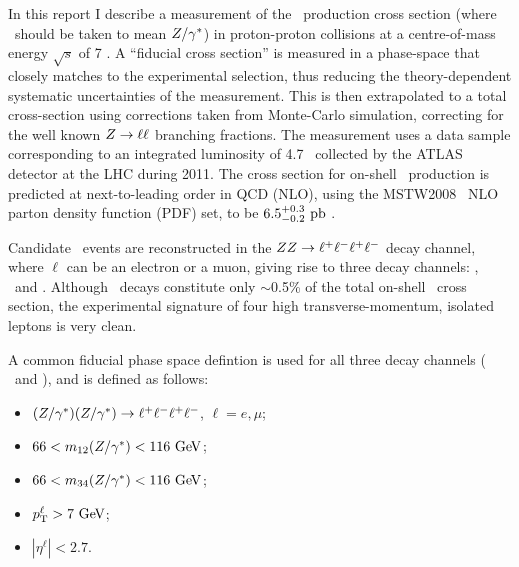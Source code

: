 In this report I describe a measurement of the \ZZ\ production cross section
(where \Z\ should be taken 
to mean $Z/\gamma^{*}$) in proton-proton collisions at a centre-of-mass energy $\sqrt{s}$ of 7 \TeV.
A ``fiducial cross section'' is measured in a phase-space that closely matches
to the experimental selection, 
thus reducing the theory-dependent systematic uncertainties of the measurement.
This is then extrapolated to a total cross-section using corrections taken from
Monte-Carlo simulation, correcting for the well known $Z \rightarrow \ell \ell$
branching fractions.
The measurement uses a data sample corresponding to an integrated luminosity of 4.7 \ifb\ collected by the ATLAS detector at 
the LHC during 2011. 
The cross section for on-shell \ZZ\ production is
predicted at next-to-leading order in QCD (NLO), using the MSTW2008~\cite{bib:MSTW2008} NLO parton density function (PDF) set, 
to be $6.5^{+0.3}_{-0.2}\ \pb$ \cite{Campbell:2011}.  

Candidate \ZZ\ events are reconstructed in the $ZZ\rightarrow\ell^+ \ell^-\ell^+ \ell^-$ decay
channel, where $\ell$ can be an electron or a muon, giving rise to three decay
channels: \eeee, \mumumumu\ and \eemumu.
Although \zzllll\ decays constitute only $\sim$0.5\% of the total on-shell \ZZ\ cross section, 
the experimental signature of four high transverse-momentum, isolated leptons is very clean.  

A common fiducial phase space defintion is used for all three decay channels (\ee\ee\,
\mumu\mumu\ and \ee\mumu), and is defined as follows:

\begin{itemize}
\item $(Z/\gamma^*)(Z/\gamma^*)\rightarrow\ell^+ \ell^-\ell^+ \ell^-$, $\ell = e,\mu$;
\item $66 < m_{12}(\Z/\gamma^*) <  116\GeV$;
\item $66 < m_{34}(\Z/\gamma^*) <  116\GeV$;
\item $\pT^{\ell} > 7\GeV$;
\item $|\eta^{\ell}| < 2.7$.
\end{itemize}


